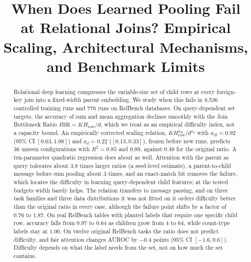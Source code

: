 \documentclass[conference]{IEEEtran}
\newcommand{\jbr}{\mathrm{JBR}}
\begin{document}
\title{When Does Learned Pooling Fail at Relational Joins? Empirical Scaling, Architectural Mechanisms, and Benchmark Limits}

\author{
}

\maketitle

\begin{abstract}
Relational deep learning compresses the variable-size set of child rows at every foreign-key join into a fixed-width parent embedding. We study when this fails in 8{,}536 controlled training runs and 776 runs on RelBench databases. On query-dependent set targets, the accuracy of sum and mean aggregation declines smoothly with the Join Bottleneck Ratio $\jbr = K H_{\mathrm{row}}/d$, which we treat as an empirical difficulty index, not a capacity bound. An empirically corrected scaling relation, $K H_{\mathrm{row}}^{a_H}/d^{a_d}$ with $a_H = 0.92$ (95\% CI $[0.63, 1.08]$) and $a_d = 0.22$ ($[0.13, 0.33]$), frozen before new runs, predicts 36 unseen configurations with $R^2 = 0.85$ and $0.89$, against $0.48$ for the original ratio. A ten-parameter quadratic regression does about as well. Attention with the parent as query tolerates about 3.8 times larger ratios (a seed-level estimate), a parent-to-child message before sum pooling about 3 times, and an exact-match bit removes the failure, which locates the difficulty in learning query-dependent child features; at the tested budgets width barely helps. The relation transfers to message passing, and on three task families and three data distributions it was not fitted on it orders difficulty better than the original ratio in every case, although the failure point shifts by a factor of $0.76$ to $1.87$. On real RelBench tables with planted labels that require one specific child row, accuracy falls from 0.97 to 0.64 as children grow from 4 to 64, while count-type labels stay at 1.00. On twelve original RelBench tasks the ratio does not predict difficulty, and fair attention changes AUROC by $-0.4$ points (95\% CI $[-1.6, 0.6]$). Difficulty depends on what the label needs from the set, not on how much the set contains.
\end{abstract}
\end{document}
